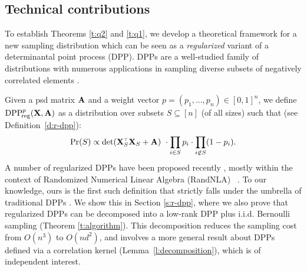 \documentclass[11pt]{article}
\begin{document}
\subsection{Technical contributions}
  To establish Theorems \ref{t:q2} and \ref{t:q1}, 
  we develop a theoretical framework for a new sampling distribution
  which can be seen as a \emph{regularized} variant of a determinantal point
  process (DPP). DPPs are a well-studied family of distributions
with numerous applications in sampling diverse subsets
  of negatively correlated elements \citep[see][]{dpp-ml}.

  Given a psd matrix $\mathbf A$ and a weight vector $p=(p_1,...,p_n)\in[0,1]^n$, we
define ${{\mathrm{DPP}}_{\!\mathrm{reg}}^{p}}(\mathbf X,\mathbf A)$ as a distribution over subsets $S\subseteq[n]$ (of all
sizes) such that (see Definition~\ref{d:r-dpp}):
\begin{align*}
 \Pr(S)\propto \det(
  \X_S^\top\X_S+\A)\ \cdot \prod_{i\in S}p_{i}\cdot\prod_{i\not\in
  S}(1-p_i).
\end{align*}
A number of regularized DPPs have been proposed recently
\citep{dpp-intermediate,regularized-volume-sampling}, mostly within the context
of Randomized Numerical Linear Algebra (RandNLA)~
\citep{Mah-mat-rev_JRNL,DM16_CACM,RandNLA_PCMIchapter_TR}.
To our knowledge, ours is the first such definition that strictly falls
under the umbrella of traditional DPPs \citep{dpp-ml}.
We show this in Section \ref{s:r-dpp}, where we also prove that
regularized DPPs can be decomposed into a low-rank DPP plus
i.i.d. Bernoulli sampling (Theorem \ref{t:algorithm}). This decomposition reduces
the sampling cost from $O(n^3)$ to $O(nd^2)$,
and involves a more general result about DPPs defined via a
correlation kernel (Lemma~\ref{l:decomposition}), which is of
independent interest.
\end{document}
